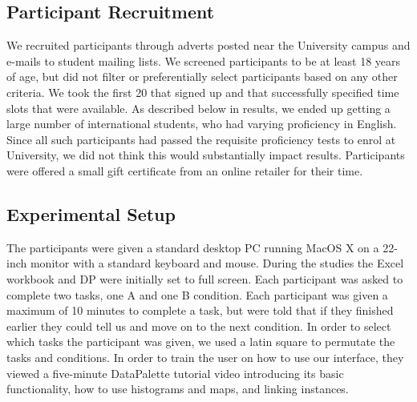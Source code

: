 \documentclass{sigchi}
\begin{document}
\subsection{Participant Recruitment}
We recruited participants through adverts posted near the University campus and e-mails to student mailing lists.  We screened participants to be at least 18 years of age, but did not filter or preferentially select participants based on any other criteria.  We took the first 20 that signed up and that successfully specified time slots that were available.   As described below in results, we ended up getting a large number of international students, who had varying proficiency in English.  Since all such participants had passed the requisite proficiency tests to enrol at University, we did not think this would substantially impact results.  Participants were offered a small gift certificate from an online retailer for their time. 

\subsection{Experimental Setup}
The participants were given a standard desktop PC running MacOS X on a 22-inch monitor with a standard keyboard and mouse.  During the studies the Excel workbook and DP were initially set to full screen.  Each participant was asked to complete two tasks, one A and one B condition.  Each participant was given a maximum of 10 minutes to complete a task, but were told that if they finished earlier they could tell us and move on to the next condition.  In order to select which tasks the participant was given, we used a latin square to permutate the tasks and conditions.  In order to train the user on how to use our interface, they viewed a five-minute DataPalette tutorial video introducing its basic functionality, how to use histograms and maps, and linking instances.


\end{document}
